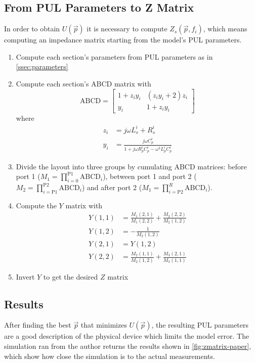 \subsection{From PUL Parameters to Z Matrix}
\label{ssec:from-parameters-to-Z-matrix}
In order to obtain $U(\vec{p})$ it is necessary to compute $Z_s\left(\vec{p}, f_i\right)$, which means computing an impedance matrix starting from the model's PUL parameters.
\begin{enumerate}
    \item Compute each section's parameters from PUL parameters as in \autoref{ssec:parameters}
    \item Compute each section's ABCD matrix with
    \begin{equation*}
        \text{ABCD} = \begin{bmatrix}
            1 + z_i y_i   & (z_i y_i + 2) z_i \\
            y_i           & 1 + z_i y_i
        \end{bmatrix}
    \end{equation*}
    where
    \begin{align*}
        z_i &= j \omega L_s^i + R_s^i \\
        y_i &= \frac{j \omega C_p^i}{1 + j\omega R_p^i C_p^i - \omega^2 L_p^i C_p^i}
    \end{align*}
    \item Divide the layout into three groups by cumulating ABCD matrices: before port 1 ($M_1 = \prod_{i = 0} ^ \text{P1} \text{ABCD}_i$), between port 1 and port 2 ($M_2 = \prod_{i = \text{P1}} ^ \text{P2} \text{ABCD}_i$) and after port 2 ($M_1 = \prod_{i = \text{P2}} ^ R \text{ABCD}_i$).

    \item Compute the $Y$ matrix with
    \begin{align*}
        Y(1, 1) &= \frac{M_1(2, 1)}{M_1(2, 2)} + \frac{M_2(2, 2)}{M_2(1, 2)} \\
        Y(1, 2) &= -\frac{1}{M_2(1, 2)} \\
        Y(2, 1) &= Y(1, 2) \\
        Y(2, 2) &= \frac{M_2(1, 1)}{M_2(1, 2)} + \frac{M_3(2, 1)}{M_3(1, 1)}
    \end{align*}
    \item Invert $Y$ to get the desired $Z$ matrix
\end{enumerate}

\subsection{Results}
After finding the best $\vec{p}$ that minimizes $U(\vec{p})$, the resulting PUL parameters are a good description of the physical device which limits the model error. The simulation ran from the author returns the results shown in \autoref{fig:zmatrix-paper}, which show how close the simulation is to the actual measurements.

